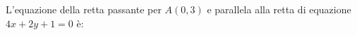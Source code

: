 L'equazione della retta passante per \(\displaystyle A(0, 3)\)
e parallela alla retta di equazione \(\displaystyle 4x + 2y + 1 = 0\) è: 